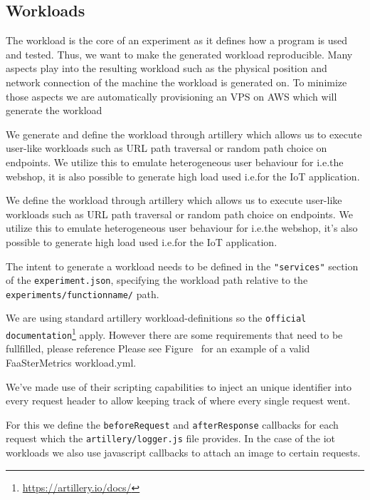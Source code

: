 \documentclass[../main.tex]{subfiles}
\begin{document}
\subsection{Workloads}\label{sec:WorkloadsStructure}

The workload is the core of an experiment as it defines how a program is used and tested. 
Thus, we want to make the generated workload reproducible. 
Many aspects play into the resulting workload such as the physical position and network connection of the machine the workload is generated on. 
To minimize those aspects we are automatically provisioning an VPS on AWS which will generate the workload

We generate and define the workload through artillery which allows us to execute user-like workloads 
such as URL path traversal or random path choice on endpoints. 
We utilize this to emulate heterogeneous user behaviour for i.e.\@ the webshop, 
it is also possible to generate high load used i.e.\@ for the IoT application.

We define the workload through artillery which allows us to execute user-like workloads such as URL path traversal or random path choice on endpoints. We utilize this to emulate heterogeneous user behaviour for i.e.\@ the webshop, it's also possible to generate high load used i.e.\@ for the IoT application.

The intent to generate a workload needs to be defined in the \texttt{"services"} section of the \texttt{experiment.json}, specifying the workload path relative to the \texttt{experiments/functionname/} path. %

We are using standard artillery workload-definitions so the \texttt{official documentation}\footnote{\url{https://artillery.io/docs/}} apply. However there are some requirements that need to be fullfilled, please reference %
Please see Figure~ for an example of a valid FaaSterMetrics workload.yml.

We've made use of their scripting capabilities to inject an unique identifier into every request header to allow keeping track of where every single request went. 

For this we define the \texttt{beforeRequest} and \texttt{afterResponse} callbacks for each request which the \texttt{artillery/logger.js} file provides.
In the case of the iot workloads we also use javascript callbacks to attach an image to certain requests.
\end{document}

